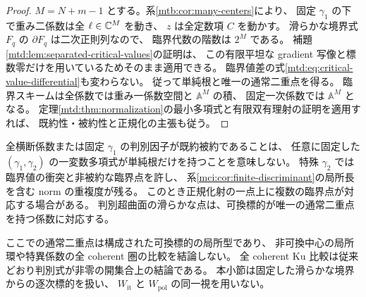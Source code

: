 \begin{proof}
$M=N+m-1$ とする。系\ref{mtb:cor:many-centers}により、
固定 $\gamma_1$ の下で重み二係数は全 $\ell\in\mathbb C^M$ を動き、
$z$ は全定数項 $C$ を動かす。
滑らかな境界式 $F_q$ の $\partial F_q$ は二次正則列なので、
臨界代数の階数は $2^M$ である。
補題\ref{mtd:lem:separated-critical-values}の証明は、
この有限平坦な gradient 写像と標数零だけを用いているためそのまま適用できる。
臨界値差の式\eqref{mtd:eq:critical-value-differential}も変わらない。
従って単純根と唯一の通常二重点を得る。
臨界スキームは全係数では重み一係数空間と $\mathbb A^M$ の積、
固定一次係数では $\mathbb A^M$ となる。
定理\ref{mtd:thm:normalization}の最小多項式と有限双有理射の証明を適用すれば、
既約性・被約性と正規化の主張も従う。
\end{proof}

\begin{remark}[特殊化と特異点対応の範囲]
\label{mtd:rem:scope}
全横断係数または固定 $\gamma_1$ の判別因子が既約被約であることは、
任意に固定した $(\gamma_1,\gamma_2)$ の一変数多項式が単純根だけを持つことを意味しない。
特殊 $\gamma_2$ では臨界値の衝突と非被約な臨界点を許し、
系\ref{mci:cor:finite-discriminant}の局所長を含む norm の重複度が残る。
このとき正規化射の一点上に複数の臨界点が対応する場合がある。
判別超曲面の滑らかな点は、可換標的が唯一の通常二重点を持つ係数に対応する。

ここでの通常二重点は構成された可換標的の局所型であり、
非可換中心の局所環や特異係数の全 coherent 圏の比較を結論しない。
全 coherent Ku 比較は従来どおり判別式が非零の開集合上の結論である。
本小節は固定した滑らかな境界からの逐次標的を扱い、
$W_{\mathrm{it}}$ と $W_{\mathrm{pol}}$ の同一視を用いない。
\end{remark}
